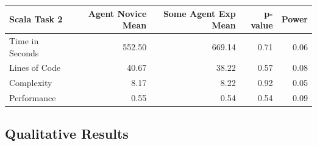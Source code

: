 \begin{center}
\begin{table}[h]
\begin{center}
\begin{tabular}{|l|r|r|r|r|}\hline
Scala Task 2 & Agent Novice Mean & Some Agent Exp Mean & p-value & Power\\\hline
Time in Seconds & 552.50 & 669.14 & 0.71 & 0.06\\
Lines of Code & 40.67 & 38.22 & 0.57 & 0.08\\
Complexity & 8.17 & 8.22 & 0.92 & 0.05\\
Performance & 0.55 & 0.54 & 0.54 & 0.09\\
\hline
\end{tabular}

\end{center}
\label{tbl:agent-experience}
\end{table}
\end{center}


\subsection{Qualitative Results}

